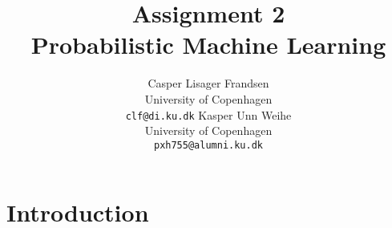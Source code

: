 \documentclass{article}
\title{
  Assignment 2\\
  Probabilistic Machine Learning
}
\author{Casper Lisager Frandsen\\
  University of Copenhagen\\
  \texttt{clf@di.ku.dk}
  \AND           %
  Kasper Unn Weihe\\
  University of Copenhagen\\
  \texttt{pxh755@alumni.ku.dk}
}
\begin{document}
\maketitle


\section{Introduction}





%
%
\end{document}
